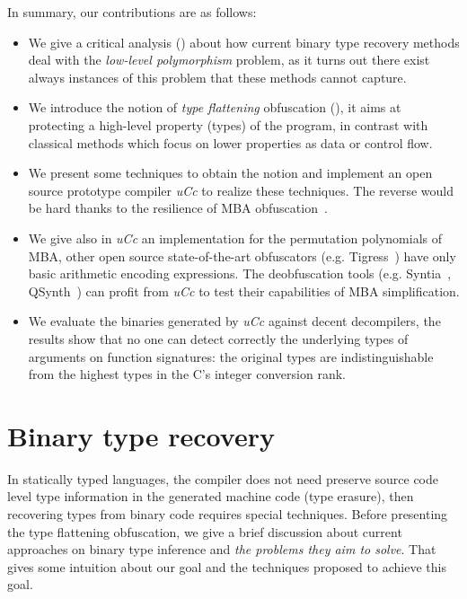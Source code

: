 \documentclass[compsoc,conference,a4paper,10pt,times]{IEEEtran}
\begin{document}
In summary, our contributions are as follows:
\begin{itemize}
  \item We give a critical analysis () about how current binary type recovery methods deal with
  the \emph{low-level polymorphism} problem, as it turns out there exist always instances of this problem that
  these methods cannot capture.

  \item We introduce the notion of \emph{type flattening} obfuscation (), it aims at protecting a high-level
  property (types) of the program, in contrast with classical methods which focus on lower
  properties as data or control flow.

  \item We present some techniques to obtain the notion and implement an open source prototype
  compiler \emph{uCc} to realize these techniques.
  The reverse would be hard thanks to the resilience of MBA obfuscation~\cite{eyrolles_defeating_2016,biondi_effectiveness_2017}.

  \item We give also in \emph{uCc} an implementation for the permutation polynomials
  of MBA, other open source state-of-the-art obfuscators
  (e.g. Tigress~\cite{noauthor_tigress_nodate}) have only basic arithmetic encoding expressions.
  The deobfuscation tools (e.g. Syntia~\cite{blazytko_syntia_2017}, QSynth~\cite{david_qsynth_2020})
  can profit from \emph{uCc} to test their capabilities of MBA simplification.

  \item We evaluate the binaries generated by \emph{uCc} against decent decompilers, the results
  show that no one can detect correctly the underlying types of arguments on function signatures: the
  original types are indistinguishable from the highest types in the C's integer conversion rank.
\end{itemize}

\section{Binary type recovery}
\noindent
In statically typed languages, the compiler does not need preserve source code level type information in
the generated machine code (type erasure), then recovering types from binary code requires special
techniques. Before presenting the type flattening obfuscation, we give a brief discussion about
current approaches on binary type inference and \emph{the problems they aim to solve}.
That gives some intuition about our goal and the techniques proposed to achieve this goal.
\end{document}
